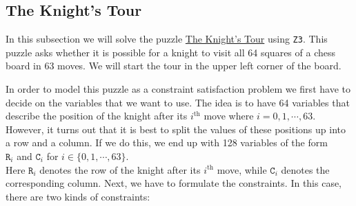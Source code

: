 \subsection{The Knight's Tour}
In this subsection we will solve the puzzle \href{https://en.wikipedia.org/wiki/Knight%27s_tour}{The Knight's Tour} 
using \texttt{Z3}.  This puzzle asks whether it is possible for a knight to visit all 64 squares of a chess board
in 63 moves.  We will start the tour in the upper left corner of the board.  

In order to model this puzzle as a constraint satisfaction problem we first have to decide on the variables
that we want to use. The idea is to have 64 variables that describe the position of the knight after its
$i^{\mathrm{th}}$ move where $i=0,1,\cdots,63$.  However, it turns out that it is best to split the values of these positions up into a
row and a column.  If we do this, we end up with 128 variables of the form
\\[0.2cm]
\hspace*{1.3cm}
$\mathtt{R}_i$ and $\mathtt{C}_i$ \quad for $i \in \{0, 1, \cdots, 63\}$.
\\[0.2cm]
Here $\mathtt{R}_i$ denotes the row of the knight after its $i^{\mathrm{th}}$ move, while $\mathtt{C}_i$
denotes the corresponding column.  
Next, we have to formulate the constraints.  In this case, there are two kinds of constraints:
